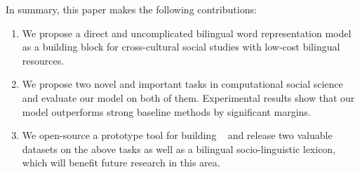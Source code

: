 %
In summary, this paper makes the following contributions:
\begin{enumerate}
\item We propose a direct and uncomplicated bilingual word 
representation model as a building block
for cross-cultural social studies with low-cost bilingual resources. 
\item We propose two novel and important tasks in computational social 
science and evaluate our model on both of them. Experimental results
show that our model outperforms strong baseline methods 
by significant margins. 
\item We open-source a prototype tool for building \textit{\socvec~} and 
release two valuable datasets on the above tasks as well as 
a bilingual socio-linguistic lexicon, which will benefit future research 
in this area. 
\end{enumerate}
